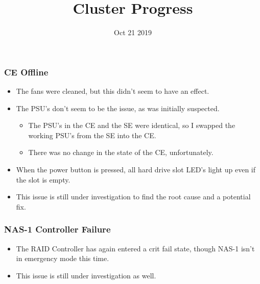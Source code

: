 \documentclass{beamer}
\title{Cluster Progress}
\date{Oct 21 2019}
\begin{document}

\begin{frame}
  \maketitle
\end{frame}


\begin{frame}
  \frametitle{CE Offline}

  \begin{itemize}
  \item The fans were cleaned, but this didn't seem to have an effect.
  \item The PSU's don't seem to be the issue, as was initially suspected.
    \begin{itemize}
    \item The PSU's in the CE and the SE were identical, so I swapped the working PSU's from the SE into the CE.
      \item There was no change in the state of the CE, unfortunately.
    \end{itemize}
  \item When the power button is pressed, all hard drive slot LED's light up even if the slot is empty.
  \item This issue is still under investigation to find the root cause and a potential fix.
  \end{itemize}
\end{frame}

\begin{frame}
  \frametitle{NAS-1 Controller Failure}

  \begin{itemize}
  \item The RAID Controller has again entered a crit fail state, though NAS-1 isn't in emergency mode this time.
    \item This issue is still under investigation as well.
    \end{itemize}

  \end{frame}

\end{document}

